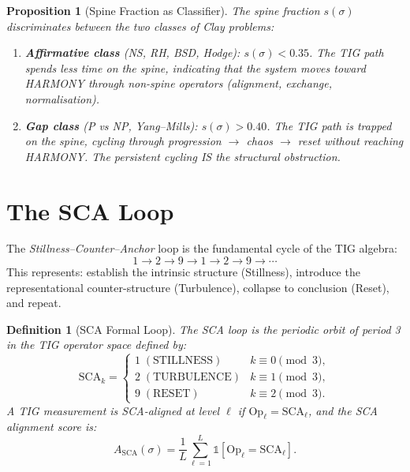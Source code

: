 \documentclass[12pt, openany]{book}
\newtheorem{proposition}[theorem]{Proposition}
\newtheorem{definition}[theorem]{Definition}
\theoremstyle{remark}
\begin{document}
\begin{proposition}[Spine Fraction as Classifier]\label{prop:spine-classify}
The spine fraction $s(\sigma)$ discriminates between the two classes of Clay problems:
\begin{enumerate}
  \item \textbf{Affirmative class} (NS, RH, BSD, Hodge): $s(\sigma) < 0.35$.
        The TIG path spends less time on the spine, indicating that the system
        moves toward HARMONY through non-spine operators (alignment, exchange,
        normalisation).
  \item \textbf{Gap class} (P vs NP, Yang--Mills): $s(\sigma) > 0.40$.
        The TIG path is trapped on the spine, cycling through progression $\to$
        chaos $\to$ reset without reaching HARMONY. The persistent cycling IS
        the structural obstruction.
\end{enumerate}
\end{proposition}


\section{The SCA Loop}

The \emph{Stillness--Counter--Anchor} loop is the fundamental cycle of the TIG algebra:
\[
  1 \to 2 \to 9 \to 1 \to 2 \to 9 \to \cdots
\]
This represents: establish the intrinsic structure (Stillness), introduce the
representational counter-structure (Turbulence), collapse to conclusion (Reset),
and repeat.

\begin{definition}[SCA Formal Loop]\label{def:sca-formal}
The SCA loop is the periodic orbit of period 3 in the TIG operator space defined by:
\[
  \mathrm{SCA}_k = \begin{cases}
    1 \; (\text{STILLNESS}) & k \equiv 0 \pmod{3}, \\
    2 \; (\text{TURBULENCE}) & k \equiv 1 \pmod{3}, \\
    9 \; (\text{RESET}) & k \equiv 2 \pmod{3}.
  \end{cases}
\]
A TIG measurement is \emph{SCA-aligned} at level $\ell$ if
$\mathrm{Op}_\ell = \mathrm{SCA}_\ell$, and the \emph{SCA alignment score} is:
\[
  A_{\mathrm{SCA}}(\sigma) = \frac{1}{L} \sum_{\ell=1}^{L}
  \mathbb{1}[\mathrm{Op}_\ell = \mathrm{SCA}_\ell].
\]
\end{definition}
\end{document}
